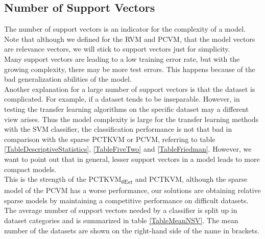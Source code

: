 \FloatBarrier
\subsection{Number of Support Vectors}\label{EmSubSecNumberSV}
The number of support vectors is an indicator for the complexity of a model. 
Note that although we defined for the \acs{RVM} and \acs{PCVM}, that the model vectors are relevance vectors, we will stick to support vectors just for simplicity.\\
Many support vectors are leading to a low training error rate, but with the growing complexity, there may be more test errors. 
This happens because of the bad generalization abilities of the model.\cite[p. 81]{Igual.2017}\\
Another explanation for a large number of support vectors is that the dataset is complicated. For example, if a dataset tends to be inseparable.\cite[p. 78;86]{Abe.2010}
However, in testing the transfer learning algorithms on the specific dataset may a different view arises. 
Thus the model complexity is large for the transfer learning methods with the \acs{SVM} classifier, the classification performance is not that bad in comparison with the sparse \acs{PCTKVM} or \acs{PCVM}, referring to table \ref{TableDescriptiveStatistics}, \ref{TableFiveTwo} and \ref{TableFriedman}.
However, we want to point out that in general, lesser support vectors in a model leads to more compact models.\cite[p. 349]{Bishop.2009}\\
This is the strength of the \acs{PCTKVM}\textsubscript{$\theta$Est} and \acs{PCTKVM}, although the sparse model of the \acs{PCVM} has a worse performance, our solutions are obtaining relative sparse models by maintaining a competitive performance on difficult datasets.
The average number of support vectors needed by a classifier is split up in dataset categories and is summarized in table \ref{TableMeanNSV}. 
The mean number of the datasets are shown on the right-hand side of the name in brackets.
\begin{table}[h]
	\centering
\end{table}
\FloatBarrier

